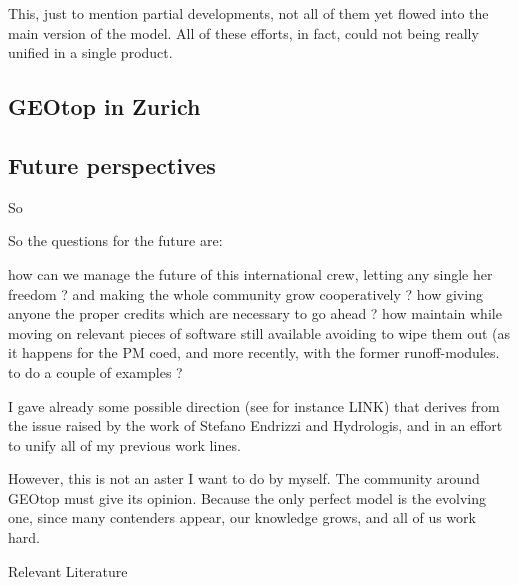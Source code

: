 This, just to mention partial developments, not all of them yet flowed into the main version of the model. All of these efforts, in fact, could not being really unified in a single product. 

\subsection{GEOtop in Zurich}


\subsection{Future perspectives}
So

So the questions for the future are: 

how can we manage the future of this international crew, letting any single her freedom ?
and making the whole community grow cooperatively ?
how giving anyone the proper credits which are necessary to go ahead ?
how maintain while moving on relevant pieces of software still available avoiding to wipe them out (as it happens for the PM coed, and more recently, with the former runoff-modules. to do a couple of examples ?

I gave already some possible direction (see for instance LINK) that derives from the issue raised by the work of Stefano Endrizzi and Hydrologis, and in an effort to unify all of my previous work lines.

However, this is not an aster I want to do by myself. The community around GEOtop must give its opinion. Because the only perfect model is the evolving one, since many contenders appear, our knowledge grows, and all of us work hard. 

Relevant Literature 
